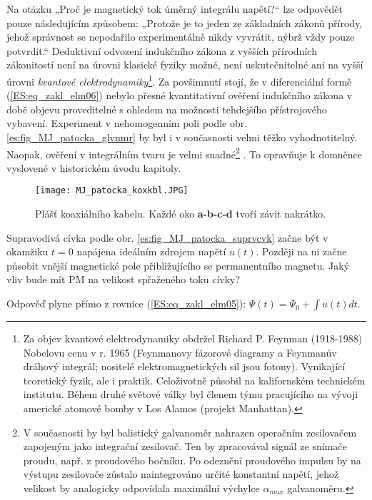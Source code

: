    Na otázku „Proč je magnetický tok úměrný integrálu napětí?“ lze odpovědět pouze následujícím
    způsobem: „Protože je to jeden ze základních zákonů přírody, jehož správnost se nepodařilo
    experimentálně nikdy vyvrátit, nýbrž vždy pouze potvrdit.“ Deduktivní odvození indukčního
    zákona z vyšších přírodních zákonitostí není na úrovni klasické fyziky možné, není
    uskutečnitelné ani na vyšší úrovni \emph{kvantové elektrodynamiky}\footnote{Za objev kvantové
    elektrodynamiky obdržel Richard P. Feynman (1918-1988) Nobelovu cenu v r. 1965 (Feynmanovy
    fázorové diagramy a Feynmanův dráhový integrál; nositelé elektromagnetických sil jsou fotony). 
    Vynikající teoretický fyzik, ale i praktik. Celoživotně působil na kalifornském technickém
    institutu. Během druhé světové války byl členem týmu pracujícího na vývoji americké atomové
    bomby v Los Alamos (projekt Manhattan).}. Za povšimnutí stojí, že v diferenciální formě
    (\ref{ES:eq_zakl_elm06}) nebylo přesné kvantitativní ověření indukčního zákona v době objevu
    proveditelné s ohledem na možnosti tehdejšího přístrojového vybavení. Experiment v nehomogenním
    poli podle obr. \ref{es:fig_MJ_patocka_glvnmr} by byl i v současnosti velmi těžko
    vyhodnotitelný. Naopak, ověření v integrálním tvaru je velmi snadné\footnote{V současnosti by
    byl balistický galvanoměr nahrazen operačním zesilovačem zapojeným jako integrační zesilovač.
    Ten by zpracovával signál ze snímače proudu, např. z proudového bočníku. Po odeznění proudového
    impulsu by na výstupu zesilovače zůstalo naintegrováno určité konstantní napětí, jehož velikost
    by analogicky odpovídala maximální výchylce \(\alpha_{max}\) galvanoměru.} . To opravňuje k
    domněnce vyslovené v historickém úvodu kapitoly.
    
    \begin{figure}[ht!]
      \centering
      \texttt{[image: MJ\_patocka\_koxkbl.JPG]}
      \caption[Plášť koaxiálního kabelu.]{Plášť	koaxiálního kabelu. Každé oko \textbf{a-b-c-d} tvoří
               závit nakrátko.}
      \label{es:fig_MJ_patocka_koxkbl}    
    \end{figure} 
      
    \begin{example}
    Supravodivá cívka podle obr. \ref{es:fig_MJ_patocka_suprvcvk} začne být v okamžiku \(t = 0\)
    napájena ideálním zdrojem napětí \(u(t)\). Později na ni začne působit vnější magnetické pole
    přibližujícího se permanentního magnetu. Jaký vliv bude mít PM na velikost spřaženého toku
    cívky?
    
    Odpověď plyne přímo z rovnice (\ref{ES:eq_zakl_elm05}): \(\Psi(t) = \Psi_0 +\int u(t)dt\).
    \end{example} 
    
